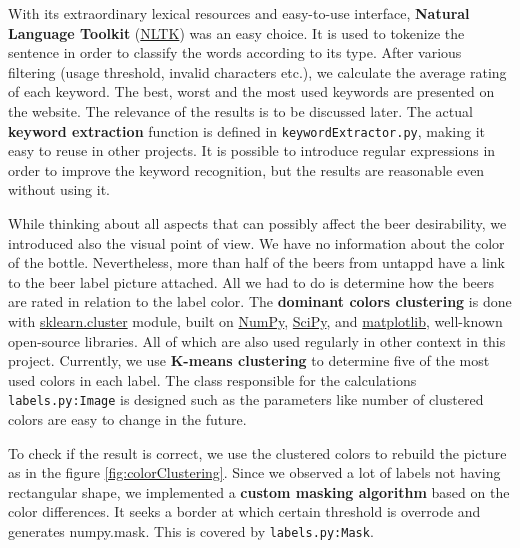 \documentclass[10pt]{IEEEtran}
\begin{document}
With its extraordinary lexical resources and easy-to-use interface, \textbf{Natural Language Toolkit} (\href{http://www.nltk.org/}{NLTK}) was an easy choice. It is used to tokenize the sentence in order to classify the words according to its type. After various filtering (usage threshold, invalid characters etc.), we calculate the average rating of each keyword. The best, worst and the most used keywords are presented on the website. The relevance of the results is to be discussed later. The actual \textbf{keyword extraction} function is defined in \texttt{keywordExtractor.py}, making it easy to reuse in other projects. It is possible to introduce regular expressions in order to improve the keyword recognition, but the results are reasonable even without using it.

While thinking about all aspects that can possibly affect the beer desirability, we introduced also the visual point of view. We have no information about the color of the bottle. Nevertheless, more than half of the beers from untappd have a link to the beer label picture attached. All we had to do is determine how the beers are rated in relation to the label color. The \textbf{dominant colors clustering} is done with \href{http://scikit-learn.org/stable/modules/classes.html#module-sklearn.cluster}{sklearn.cluster} module, built on \href{http://www.numpy.org/}{NumPy}, \href{http://scipy.org/}{SciPy}, and \href{http://matplotlib.org/}{matplotlib}, well-known open-source libraries. All of which are also used regularly in other context in this project. Currently, we use \textbf{K-means clustering} to determine five of the most used colors in each label. The class responsible for the calculations \texttt{labels.py:Image} is designed such as the parameters like number of clustered colors are easy to change in the future.

To check if the result is correct, we use the clustered colors to rebuild the picture as in the figure \ref{fig:colorClustering}. Since we observed a lot of labels not having rectangular shape, we implemented a \textbf{custom masking algorithm} based on the color differences. It seeks a border at which certain threshold is overrode and generates numpy.mask. This is covered by \texttt{labels.py:Mask}. 
\end{document}
